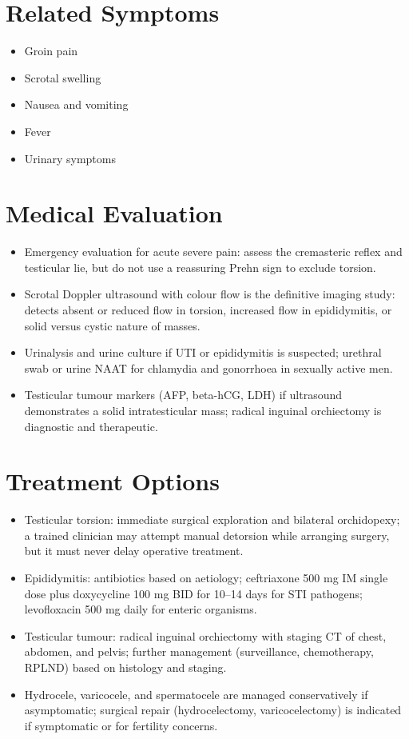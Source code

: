 \section*{Related Symptoms}
\begin{itemize}
  \item Groin pain
  \item Scrotal swelling
  \item Nausea and vomiting
  \item Fever
  \item Urinary symptoms
\end{itemize}

\section*{Medical Evaluation}
\begin{itemize}
  \item Emergency evaluation for acute severe pain: assess the cremasteric reflex and testicular lie, but do not use a reassuring Prehn sign to exclude torsion.
  \item Scrotal Doppler ultrasound with colour flow is the definitive imaging study: detects absent or reduced flow in torsion, increased flow in epididymitis, or solid versus cystic nature of masses.
  \item Urinalysis and urine culture if UTI or epididymitis is suspected; urethral swab or urine NAAT for chlamydia and gonorrhoea in sexually active men.
  \item Testicular tumour markers (AFP, beta-hCG, LDH) if ultrasound demonstrates a solid intratesticular mass; radical inguinal orchiectomy is diagnostic and therapeutic.
\end{itemize}

\section*{Treatment Options}
\begin{itemize}
  \item Testicular torsion: immediate surgical exploration and bilateral orchidopexy; a trained clinician may attempt manual detorsion while arranging surgery, but it must never delay operative treatment.
  \item Epididymitis: antibiotics based on aetiology; ceftriaxone 500 mg IM single dose plus doxycycline 100 mg BID for 10--14 days for STI pathogens; levofloxacin 500 mg daily for enteric organisms.
  \item Testicular tumour: radical inguinal orchiectomy with staging CT of chest, abdomen, and pelvis; further management (surveillance, chemotherapy, RPLND) based on histology and staging.
  \item Hydrocele, varicocele, and spermatocele are managed conservatively if asymptomatic; surgical repair (hydrocelectomy, varicocelectomy) is indicated if symptomatic or for fertility concerns.
\end{itemize}

